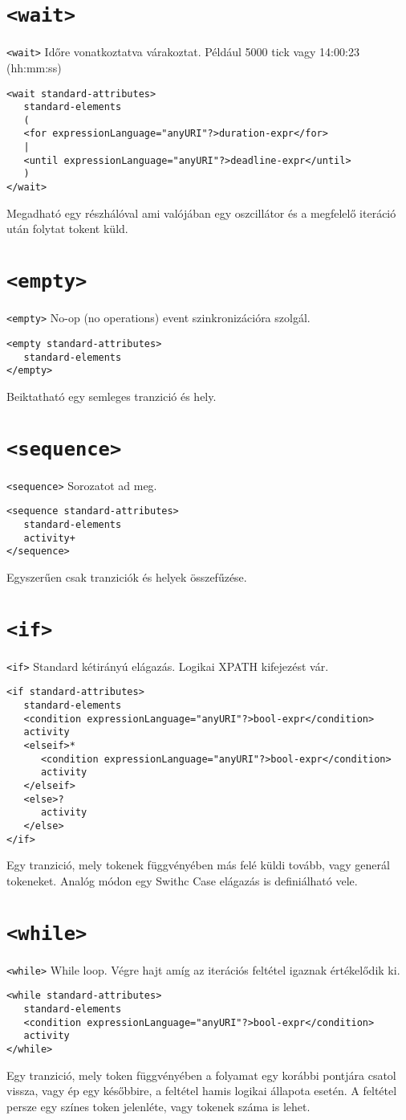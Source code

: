 \section{\texttt{<wait>}}
\texttt{<wait>} Időre vonatkoztatva várakoztat. Például 5000 tick vagy 14:00:23 (hh:mm:ss)
\begin{verbatim} 
<wait standard-attributes>
   standard-elements
   (
   <for expressionLanguage="anyURI"?>duration-expr</for>
   |
   <until expressionLanguage="anyURI"?>deadline-expr</until>
   )
</wait>
\end{verbatim}
Megadható egy részhálóval ami valójában egy oszcillátor és a megfelelő iteráció után folytat tokent küld. 

\section{\texttt{<empty>}}
\texttt{<empty>} No-op (no operations) event szinkronizációra szolgál.
\begin{verbatim}
<empty standard-attributes>
   standard-elements
</empty>
\end{verbatim}
Beiktatható egy semleges tranzició és hely.

\section{\texttt{<sequence>} }
\texttt{<sequence>} Sorozatot ad meg.
\begin{verbatim}
<sequence standard-attributes>
   standard-elements
   activity+
</sequence>
\end{verbatim} Egyszerűen csak tranziciók és helyek összefűzése. 

\section{\texttt{<if>}}
\texttt{<if>} Standard kétirányú elágazás. Logikai XPATH kifejezést vár. 
\begin{verbatim}
<if standard-attributes>
   standard-elements
   <condition expressionLanguage="anyURI"?>bool-expr</condition>
   activity
   <elseif>*
      <condition expressionLanguage="anyURI"?>bool-expr</condition>
      activity
   </elseif>
   <else>?
      activity
   </else>
</if>
\end{verbatim}
Egy tranzició, mely tokenek függvényében más felé küldi tovább, vagy generál tokeneket. Analóg módon egy Swithc Case elágazás is definiálható vele.

\section{\texttt{<while>}}
\texttt{<while>} While loop. Végre hajt amíg az iterációs feltétel igaznak értékelődik ki. 
\begin{verbatim}
<while standard-attributes>
   standard-elements
   <condition expressionLanguage="anyURI"?>bool-expr</condition>
   activity
</while>
\end{verbatim}
Egy tranzició, mely token függvényében a folyamat egy korábbi pontjára csatol vissza, vagy ép egy későbbire, a feltétel hamis logikai állapota esetén. A feltétel persze egy színes token jelenléte, vagy tokenek száma is lehet. 

